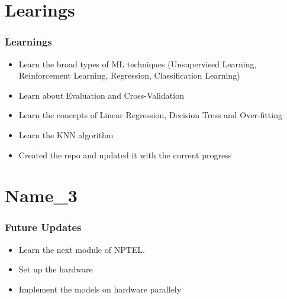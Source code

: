 \documentclass{beamer}
\begin{document}

\section{Learings}
\begin{frame}[allowframebreaks]
\frametitle{Learnings}\scriptsize

\begin{itemize}
    \item {Learn the broad types of ML techniques (Unsupervised Learning, Reinforcement Learning, Regression, Classification Learning)}
    \item {Learn about Evaluation and Cross-Validation}
    \item {Learn the concepts of Linear Regression, Decision Tress and Over-fitting}
    \item {Learn the KNN algorithm}
    \item {Created the repo and updated it with the current progress}
\end{itemize}

\end{frame}

\section{Name\_3}
\begin{frame}[allowframebreak]
\frametitle{Future Updates}\small

\begin{itemize}
    \item {Learn the next module of NPTEL.}
    \item{ Set up the hardware}
    \item{Implement the models on hardware parallely}
\end{itemize}
\end{frame}

\end{document}
